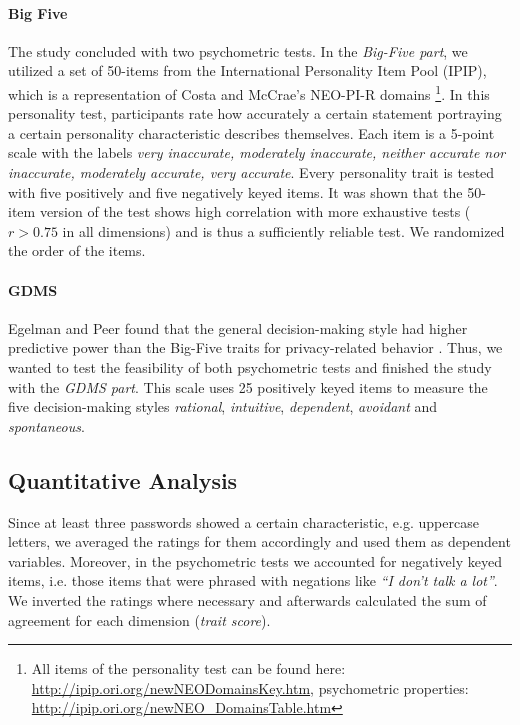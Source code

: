 \paragraph{Big Five} The study concluded with two psychometric tests. In the \textit{Big-Five part}, we utilized a set of 50-items from the International Personality Item Pool (IPIP), which is a representation of Costa and McCrae's NEO-PI-R domains \citep{Costa1992NEO}\footnote{All items of the personality test can be found here: \url{http://ipip.ori.org/newNEODomainsKey.htm}, psychometric properties: \url{http://ipip.ori.org/newNEO_DomainsTable.htm}}. In this personality test, participants rate how accurately a certain statement portraying a certain personality characteristic describes themselves. Each item is a 5-point scale with the labels \textit{very inaccurate, moderately inaccurate, neither accurate nor inaccurate, moderately accurate, very accurate}. Every personality trait is tested with five positively and five negatively keyed items. It was shown that the 50-item version of the test shows high correlation with more exhaustive tests ($r > 0.75$ in all dimensions) and is thus a sufficiently reliable test. We randomized the order of the items.

\paragraph{GDMS} Egelman and Peer found that the general decision-making style had higher predictive power than the Big-Five traits for privacy-related behavior \cite{Egelman2015AverageUser}. Thus, we wanted to test the feasibility of both psychometric tests and finished the study with the \textit{GDMS part}. This scale uses 25 positively keyed items to measure the five decision-making styles \textit{rational}, \textit{intuitive}, \textit{dependent}, \textit{avoidant} and \textit{spontaneous}. 



\subsection{Quantitative Analysis}
Since at least three passwords showed a certain characteristic, e.g. uppercase letters, we averaged the ratings for them accordingly and used them as dependent variables. Moreover, in the psychometric tests we accounted for negatively keyed items, i.e. those items that were phrased with negations like \textit{``I don't talk a lot''}. We inverted the ratings where necessary and afterwards calculated the sum of agreement for each dimension (\textit{trait score}). 

